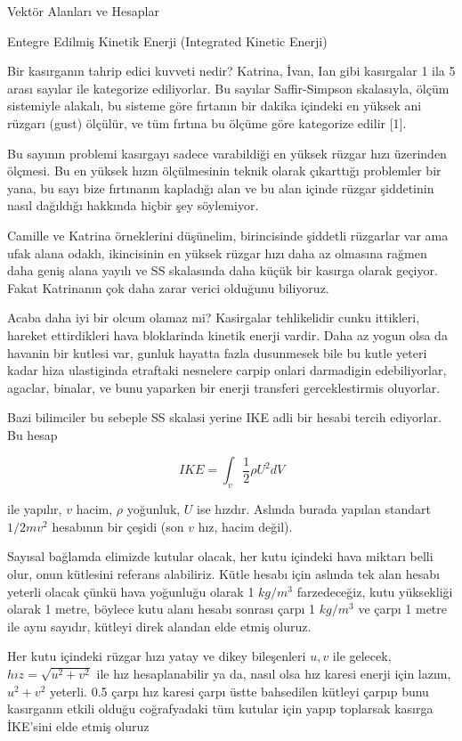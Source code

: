 \documentclass[12pt,fleqn]{article}\usepackage{../../common}
\begin{document}
Vektör Alanları ve Hesaplar

Entegre Edilmiş Kinetik Enerji (Integrated Kinetic Enerji)

Bir kasırganın tahrip edici kuvveti nedir? Katrina, İvan, Ian gibi kasırgalar 1
ila 5 arası sayılar ile kategorize ediliyorlar. Bu sayılar Saffir-Simpson
skalasıyla, ölçüm sistemiyle alakalı, bu sisteme göre fırtanın bir dakika
içindeki en yüksek ani rüzgarı (gust) ölçülür, ve tüm fırtına bu ölçüme göre
kategorize edilir [1].

Bu sayının problemi kasırgayı sadece varabildiği en yüksek rüzgar hızı üzerinden
ölçmesi. Bu en yüksek hızın ölçülmesinin teknik olarak çıkarttığı problemler bir
yana, bu sayı bize fırtınanın kapladığı alan ve bu alan içinde rüzgar şiddetinin
nasıl dağıldığı hakkında hiçbir şey söylemiyor.

Camille ve Katrina örneklerini düşünelim, birincisinde şiddetli rüzgarlar var
ama ufak alana odaklı, ikincisinin en yüksek rüzgar hızı daha az olmasına rağmen
daha geniş alana yayılı ve SS skalasında daha küçük bir kasırga olarak geçiyor.
Fakat Katrinanın çok daha zarar verici olduğunu biliyoruz.

Acaba daha iyi bir olcum olamaz mi? Kasirgalar tehlikelidir cunku ittikleri,
hareket ettirdikleri hava bloklarinda kinetik enerji vardir. Daha az yogun olsa
da havanin bir kutlesi var, gunluk hayatta fazla dusunmesek bile bu kutle yeteri
kadar hiza ulastiginda etraftaki nesnelere carpip onlari darmadigin
edebiliyorlar, agaclar, binalar, ve bunu yaparken bir enerji transferi
gerceklestirmis oluyorlar.

Bazi bilimciler bu sebeple SS skalasi yerine IKE adli bir hesabi tercih
ediyorlar. Bu hesap

$$
IKE = \int_v \frac{1}{2} \rho U^2 dV
$$

ile yapılır, $v$ hacim, $\rho$ yoğunluk, $U$ ise hızdır. Aslında burada yapılan
standart $1/2 m v^2$ hesabının bir çeşidi (son $v$ hız, hacim değil).

Sayısal bağlamda elimizde kutular olacak, her kutu içindeki hava miktarı belli
olur, onun kütlesini referans alabiliriz. Kütle hesabı için aslında tek alan
hesabı yeterli olacak çünkü hava yoğunluğu olarak 1 $kg/m^3$ farzedeceğiz, kutu
yüksekliği olarak 1 metre, böylece kutu alanı hesabı sonrası çarpı 1 $kg/m^3$ ve
çarpı 1 metre ile aynı sayıdır, kütleyi direk alandan elde etmiş oluruz.

Her kutu içindeki rüzgar hızı yatay ve dikey bileşenleri $u,v$ ile gelecek, $hız
= \sqrt{u^2+v^2}$ ile hız hesaplanabilir ya da, nasıl olsa hız karesi enerji
için lazım, $u^2+v^2$ yeterli. 0.5 çarpı hız karesi çarpı üstte bahsedilen
kütleyi çarpıp bunu kasırganın etkili olduğu coğrafyadaki tüm kutular için
yapıp toplarsak kasırga İKE'sini elde etmiş oluruz 
\end{document}
